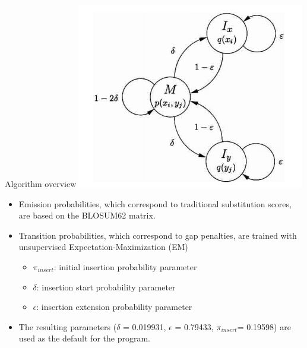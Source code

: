 \begin{frame}{Algorithm overview}
\centering
 \includegraphics[width=0.35\linewidth]{img/hmm_states.PNG}
 \begin{itemize}
     \item Emission probabilities, which correspond to traditional substitution scores, are based on the BLOSUM62 matrix.
     \item Transition probabilities, which correspond to gap penalties, are trained with unsupervised Expectation-Maximization (EM)
     \begin{itemize}
         \item $\pi_{insert}$: initial insertion probability parameter
         \item $\delta$: insertion start probability parameter
         \item $\epsilon$: insertion extension probability parameter
     \end{itemize}
     \item The resulting parameters ($\delta$ = 0.019931, $\epsilon$ = 0.79433, $\pi_{insert}$= 0.19598) are used as the default for the program.

 \end{itemize}
    
\end{frame}

